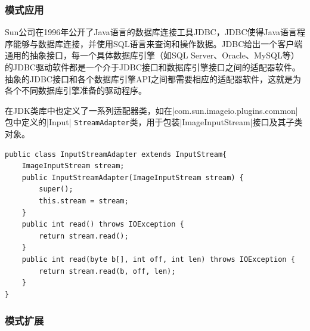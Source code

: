 \subsubsection{模式应用}
 Sun公司在1996年公开了Java语言的数据库连接工具JDBC，JDBC使得Java语言程序能够与数据库连接，并使用SQL语言来查询和操作数据。JDBC给出一个客户端通用的抽象接口，每一个具体数据库引擎（如SQL Server、Oracle、MySQL等）的JDBC驱动软件都是一个介于JDBC接口和数据库引擎接口之间的适配器软件。抽象的JDBC接口和各个数据库引擎API之间都需要相应的适配器软件，这就是为各个不同数据库引擎准备的驱动程序。

 在JDK类库中也定义了一系列适配器类，如在\sverb|com.sun.imageio.plugins.common|\; 包中定义的\sverb|Input| \verb|StreamAdapter|\;类，用于包装\sverb|ImageInputStream|\;接口及其子类对象。
\begin{lstlisting}
public class InputStreamAdapter extends InputStream{
    ImageInputStream stream;
    public InputStreamAdapter(ImageInputStream stream) {
        super();
        this.stream = stream;
    }
    public int read() throws IOException {
        return stream.read();
    }
    public int read(byte b[], int off, int len) throws IOException {
        return stream.read(b, off, len);
    }
}
\end{lstlisting}

\subsubsection{模式扩展}

